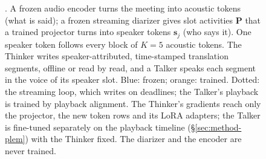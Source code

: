 \begin{figure}[t]
{}
\caption{\sys{}. A frozen audio encoder turns the meeting into acoustic tokens (what is said); a frozen streaming
diarizer gives slot activities $\bm{P}$ that a trained projector turns into speaker tokens $\bm{s}_j$ (who says it).
One speaker token follows every block of $K{=}5$ acoustic tokens. The Thinker writes speaker-attributed, time-stamped
translation segments, offline or read by read, and a Talker speaks each segment in the voice of its speaker slot.
Blue: frozen; orange: trained. Dotted: the streaming loop, which writes on deadlines; the Talker's playback is trained by playback alignment. The Thinker's gradients reach only the projector, the new token rows and its LoRA
adapters; the Talker is fine-tuned separately on the playback timeline (\S\ref{sec:method-plem}) with the Thinker
fixed. The diarizer and the encoder are never trained.}
\label{fig:arch}
\end{figure}
